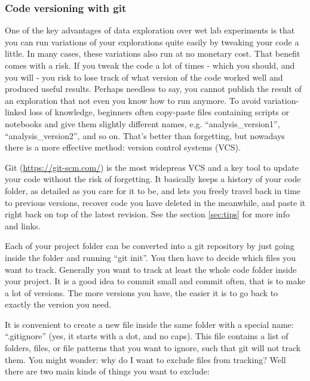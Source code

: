 \documentclass[12pt,a4paper,notitlepage,onecolumn]{article}
\begin{document}
\subsubsection{Code versioning with git}
One of the key advantages of data exploration over wet lab experiments is that you can run variations of your explorations quite easily by tweaking your code a little. In many cases, these variations also run at no monetary cost. That benefit comes with a risk. If you tweak the code a lot of times - which you should, and you will - you risk to lose track of what version of the code worked well and produced useful results. Perhaps needless to say, you cannot publish the result of an exploration that not even you know how to run anymore. To avoid variation-linked loss of knowledge, beginners often copy-paste files containing scripts or notebooks and give them slightly different names, e.g. ``analysis\_version1'', ``analysis\_version2'', and so on. That's better than forgetting, but nowadays there is a more effective method: version control systems (VCS).

Git (\url{https://git-scm.com/}) is the most widepreas VCS and a key tool to update your code without the risk of forgetting. It basically keeps a history of your code folder, as detailed as you care for it to be, and lets you freely travel back in time to previous versions, recover code you have deleted in the meanwhile, and paste it right back on top of the latest revision. See the section \ref{sec:tips} for more info and links.

Each of your project folder can be converted into a git repository by just going inside the folder and running ``git init''. You then have to decide which files you want to track. Generally you want to track at least the whole code folder inside your project. It is a good idea to commit small and commit often, that is to make a lot of versions. The more versions you have, the easier it is to go back to exactly the version you need.

It is convenient to create a new file inside the same folder with a special name: ``.gitignore'' (yes, it starts with a dot, and no caps). This file contains a list of folders, files, or file patterns that you want to ignore, such that git will not track them. You might wonder: why do I want to exclude files from tracking? Well there are two main kinds of things you want to exclude:
\end{document}

